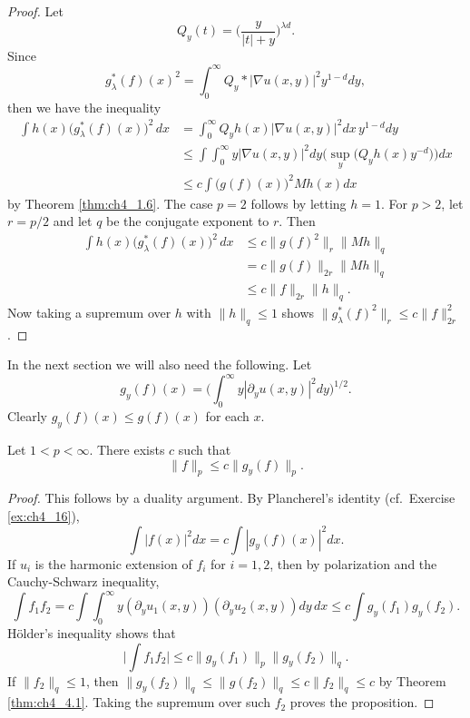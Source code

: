 \begin{proof}
Let
\[
    Q_y(t) = \Big(\frac{y}{|t| + y}\Big)^{\lambda d}.
\]
Since
\[
    g_\lambda^*(f)(x)^2 = \int_0^\infty Q_y * |\nabla u(x,y)|^2y^{1-d}dy,
\]
then we have the inequality
\begin{align*}
    \int h(x)\Big(g_\lambda^*(f)(x)\Big)^2\,dx &= \int_0^\infty Q_yh(x)|\nabla u(x,y)|^2dx\,y^{1-d}dy \\
    &\leq \int \int_0^\infty y|\nabla u(x,y)|^2dy \Big(\sup_y\big(Q_yh(x)y^{-d}\big)\Big)dx \\
    &\leq c \int \big(g(f)(x)\big)^2Mh(x)dx
\end{align*}
by Theorem \ref{thm:ch4_1.6}. The case $p = 2$ follows by letting $h = 1$. For $p > 2$, let $r = p/2$ and let $q$ be the conjugate exponent to $r$. Then
\begin{align*}
    \int h(x)\big(g_\lambda^*(f)(x)\big)^2\,dx &\leq c\|g(f)^2\|_r\|Mh\|_q \\
    &= c\|g(f)\|_{2r}\|Mh\|_q \\
    &\leq c\|f\|_{2r}\|h\|_q.
\end{align*}
Now taking a supremum over $h$ with $\|h\|_q \leq 1$ shows $\|g_\lambda^*(f)^2\|_r \leq c\|f\|_{2r}^2$.
\end{proof}

In the next section we will also need the following. Let
\begin{equation}\label{eq:ch4_4.10}
    g_y(f)(x) = \Big(\int_0^\infty y|\partial_yu(x,y)|^2dy\Big)^{1/2}.
\end{equation}
Clearly $g_y(f)(x) \leq g(f)(x)$ for each $x$.

\begin{proposition}\label{prop:ch4_4.4}
Let $1 < p < \infty$. There exists $c$ such that
\[
    \|f\|_p \leq c\|g_y(f)\|_p.
\]
\end{proposition}

\begin{proof}
This follows by a duality argument. By Plancherel's identity (cf.\ Exercise \ref{ex:ch4_16}),
\[
    \int |f(x)|^2dx = c \int |g_y(f)(x)|^2dx.
\]
If $u_i$ is the harmonic extension of $f_i$ for $i = 1,2$, then by polarization and the Cauchy-Schwarz inequality,
\[
    \int f_1f_2 = c \int \int_0^\infty y(\partial_yu_1(x,y))(\partial_yu_2(x,y))dy\,dx \leq c \int g_y(f_1)g_y(f_2).
\]
H\"older's inequality shows that
\begin{equation}\label{eq:ch4_4.11}
    \Big|\int f_1f_2\Big| \leq c\|g_y(f_1)\|_p\|g_y(f_2)\|_q.
\end{equation}
If $\|f_2\|_q \leq 1$, then $\|g_y(f_2)\|_q \leq \|g(f_2)\|_q \leq c\|f_2\|_q \leq c$ by Theorem \ref{thm:ch4_4.1}. Taking the supremum over such $f_2$ proves the proposition.
\end{proof}

